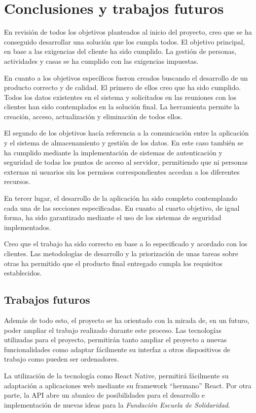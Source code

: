 \chapter{Conclusiones y trabajos futuros}

En revisión de todos los objetivos planteados al inicio del proyecto, creo que se ha conseguido desarrollar una solución que los cumpla todos. El objetivo principal, en base a las exigencias del cliente ha sido cumplido. La gestión de personas, actividades y casas se ha cumplido con las exigencias impuestas.

En cuanto a los objetivos específicos fueron creados buscando el desarrollo de un producto correcto y de calidad. El primero de ellos creo que ha sido cumplido. Todos los datos existentes en el sistema y solicitados en las reuniones con los clientes han sido contemplados en la solución final. La herramienta permite la creación, acceso, actualización y eliminación de todos ellos.

El segundo de los objetivos hacía referencia a la comunicación entre la aplicación y el sistema de almacenamiento y gestión de los datos. En este caso también se ha cumplido mediante la implementación de sistemas de autenticación y seguridad de todas los puntos de acceso al servidor, permitiendo que ni personas externas ni usuarios sin los permisos correspondientes accedan a los diferentes recursos.

En tercer lugar, el desarrollo de la aplicación ha sido completo contemplando cada una de las secciones especificadas. En cuanto al cuarto objetivo, de igual forma, ha sido garantizado mediante el uso de los sistemas de seguridad implementados.

Creo que el trabajo ha sido correcto en base a lo especificado y acordado con los clientes. Las metodologías de desarrollo y la priorización de unas tareas sobre otras ha permitido que el producto final entregado cumpla los requisitos establecidos.

\section{Trabajos futuros}

Además de todo esto, el proyecto se ha orientado con la mirada de, en un futuro, poder ampliar el trabajo realizado durante este proceso. Las tecnologías utilizadas para el proyecto, permitirán tanto ampliar el proyecto a nuevas funcionalidades como adaptar fácilmente su interfaz a otros dispositivos de trabajo como pueden ser ordenadores.

La utilización de la tecnología como React Native, permitirá fácilmente su adaptación a aplicaciones web mediante su framework ``hermano'' React. Por otra parte, la API abre un abanico de posibilidades para el desarrollo e implementación de nuevas ideas para la \textit{Fundación Escuela de Solidaridad}.